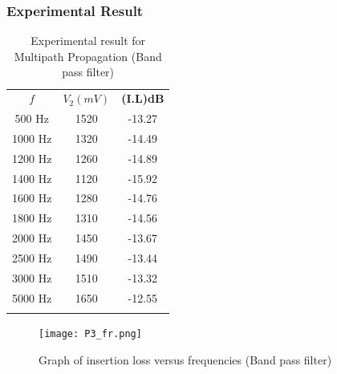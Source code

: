 \documentclass[a4paper, 12pt, english]{article}
\newcommand{\myrowcolour}{\rowcolor[gray]{0.925}}
\begin{document}
\subsubsection{Experimental Result}
\begin{table}[!ht]
	\caption{\label{tab:Table 3} Experimental result for Multipath Propagation (Band pass filter)}
	\centering
	\begin{tabular}{c c c}
		\toprule
		\textbf{$ f $}
		        & \textbf{$V_{2} (mV)$}
		        & \textbf{(I.L)dB}               \\

		\cmidrule[0.4pt](r{0.125em}){1-1}%
		\cmidrule[0.4pt](lr{0.125em}){2-2}%
		\cmidrule[0.4pt](lr{0.125em}){3-3}%

		500 Hz  & 1520                  & -13.27 \\
		\myrowcolour%
		1000 Hz & 1320                  & -14.49 \\
		1200 Hz & 1260                  & -14.89 \\
		\myrowcolour%
		1400 Hz & 1120                  & -15.92 \\
		1600 Hz & 1280                  & -14.76 \\
		\myrowcolour%
		1800 Hz & 1310                  & -14.56 \\
		2000 Hz & 1450                  & -13.67 \\
		\myrowcolour%
		2500 Hz & 1490                  & -13.44 \\
		3000 Hz & 1510                  & -13.32 \\
		\myrowcolour%
		5000 Hz & 1650                  & -12.55 \\
		\bottomrule                              \\
	\end{tabular}
\end{table}
\begin{figure}[!ht]
	\begin{center}
		\texttt{[image: P3\_fr.png]}
		\caption{\label{fig:P3_fr}Graph of insertion loss versus frequencies (Band pass filter)}
	\end{center}
\end{figure}
\FloatBarrier
\newpage
\end{document}
